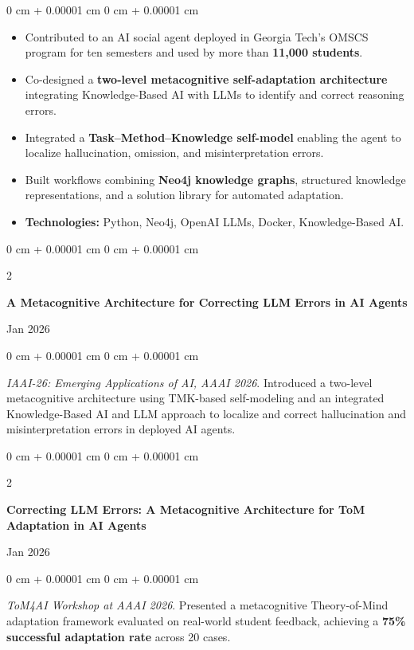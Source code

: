 \documentclass[10pt, letterpaper]{article}
\newenvironment{highlights}{
    \begin{itemize}[
        topsep=0.10 cm,
        parsep=0.10 cm,
        partopsep=0pt,
        itemsep=0pt,
        leftmargin=0 cm + 10pt
    ]
}{
    \end{itemize}
}
\newenvironment{onecolentry}{
    \begin{adjustwidth}{
        0 cm + 0.00001 cm
    }{
        0 cm + 0.00001 cm
    }
}{
    \end{adjustwidth}
}
\newenvironment{twocolentry}[2][]{
    \onecolentry
    \def\secondColumn{#2}
    \setcolumnwidth{\fill, 4.5 cm}
    \begin{paracol}{2}
}{
    \switchcolumn \raggedleft \secondColumn
    \end{paracol}
    \endonecolentry
}
\begin{document}
\begin{onecolentry}
\begin{highlights}

\item Contributed to an AI social agent deployed in Georgia Tech's OMSCS program for ten semesters and used by more than \textbf{11,000 students}.

\item Co-designed a \textbf{two-level metacognitive self-adaptation architecture} integrating Knowledge-Based AI with LLMs to identify and correct reasoning errors.

\item Integrated a \textbf{Task--Method--Knowledge self-model} enabling the agent to localize hallucination, omission, and misinterpretation errors.

\item Built workflows combining \textbf{Neo4j knowledge graphs}, structured knowledge representations, and a solution library for automated adaptation.

\item \textbf{Technologies:} Python, Neo4j, OpenAI LLMs, Docker, Knowledge-Based AI.

\end{highlights}
\end{onecolentry}

\vspace{0.2 cm}

\begin{twocolentry}{Jan 2026}
\textbf{A Metacognitive Architecture for Correcting LLM Errors in AI Agents}
\end{twocolentry}

\begin{onecolentry}
\textit{IAAI-26: Emerging Applications of AI, AAAI 2026}. Introduced a two-level metacognitive architecture using TMK-based self-modeling and an integrated Knowledge-Based AI and LLM approach to localize and correct hallucination and misinterpretation errors in deployed AI agents.
\end{onecolentry}

\vspace{0.2 cm}

\begin{twocolentry}{Jan 2026}
\textbf{Correcting LLM Errors: A Metacognitive Architecture for ToM Adaptation in AI Agents}
\end{twocolentry}

\begin{onecolentry}
\textit{ToM4AI Workshop at AAAI 2026}. Presented a metacognitive Theory-of-Mind adaptation framework evaluated on real-world student feedback, achieving a \textbf{75\% successful adaptation rate} across 20 cases.
\end{onecolentry}
\end{document}
